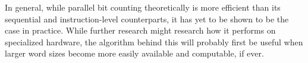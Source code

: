 In general, while parallel bit counting theoretically is more efficient than its sequential and instruction-level counterparts, it has yet to be shown to be the case in practice. While further research might research how it performs on specialized hardware, the algorithm behind this will probably first be useful when larger word sizes become more easily available and computable, if ever.
